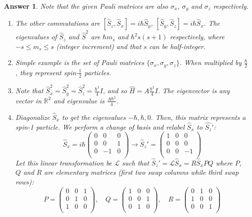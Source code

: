 \documentclass[a4paper]{article}
\newtheorem{ans}{Answer}[subsection]
\theoremstyle{new}
\begin{document}
\begin{ans}
Note that the given Pauli matrices are also $\sigma_x$, $\sigma_y$ and $\sigma_z$ respectively.
\begin{enumerate}[label=(\roman*)]
\item The other commutations are $[\hat{S}_z,\hat{S}_x]=i\hbar\hat{S}_y$, $[\hat{S}_y,\hat{S}_z]=i\hbar\hat{S}_x$. The eigenvalues of $\hat{S}_z$ and $\hat{S}^2$ are $\hbar m_s$ and $\hbar^2s(s+1)$ respectively, where $-s\leq m_s\leq s$ (integer increment) and that $s$ can be half-integer.
\item Simple example is the set of Pauli matrices $\{\sigma_x,\sigma_y,\sigma_z\}$. When multiplied by $\frac{\hbar}{2}$, they represent spin-$\frac{1}{2}$ particles.
\item Note that $\hat{S}_x^2=\hat{S}_y^2=\hat{S}_z^2=\frac{\hbar^2}{4}I$, and so $\hat{H}=A\frac{\hbar^2}{4}I$. The eigenvector is any vector in $\mathbb{R}^2$ and eigenvalue is $\frac{A\hbar^2}{4}$.
\item Diagonalize $\hat{S}_x$ to get the eigenvalues $-\hbar,\hbar,0$. Then, this matrix represents a spin-1 particle. We perform a change of basis and relabel $\hat{S}_x$ to $\hat{S_z}'$:
$$\hat{S}_x=i\hbar\begin{pmatrix}0&0&0\\0&0&1\\0&-1&0\\\end{pmatrix}\rightarrow\hat{S}_z'=\begin{pmatrix}1&0&0\\0&0&0\\0&0&-1\\\end{pmatrix}$$
Let this linear transformation be $\mathcal{L}$ such that $\hat{S}_z'=\mathcal{L}\hat{S}_x=R\hat{S}_xPQ$ where $P$, $Q$ and $R$ are elementary matrices (first two swap columns while third swap rows):
$$P=\begin{pmatrix}0&0&1\\0&1&0\\1&0&0\\\end{pmatrix},\quad Q=\begin{pmatrix}1&0&0\\0&0&1\\0&1&0\\\end{pmatrix},\quad R=\begin{pmatrix}0&1&0\\1&0&0\\0&0&1\\\end{pmatrix}$$

\end{enumerate}
\end{ans}
\end{document}

